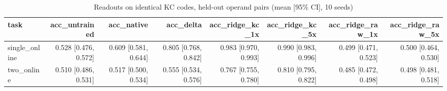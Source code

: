 \begin{table}[t]
\centering
\small
\begin{tabular}{lrrrrrrr}
\toprule
task & acc\_untrained & acc\_native & acc\_delta & acc\_ridge\_kc\_1x & acc\_ridge\_kc\_5x & acc\_ridge\_raw\_1x & acc\_ridge\_raw\_5x \\
\midrule
single\_online & 0.528 [0.476, 0.572] & 0.609 [0.581, 0.644] & 0.805 [0.768, 0.842] & 0.983 [0.970, 0.993] & 0.990 [0.983, 0.996] & 0.499 [0.471, 0.523] & 0.500 [0.464, 0.530] \\
two\_online & 0.510 [0.486, 0.531] & 0.517 [0.500, 0.534] & 0.555 [0.534, 0.576] & 0.767 [0.755, 0.780] & 0.810 [0.795, 0.822] & 0.485 [0.472, 0.498] & 0.498 [0.481, 0.518] \\
\bottomrule
\end{tabular}
\caption{Readouts on identical KC codes, held-out operand pairs (mean [95\% CI], 10 seeds)}
\label{tab:disjoint_readouts_acc}
\end{table}